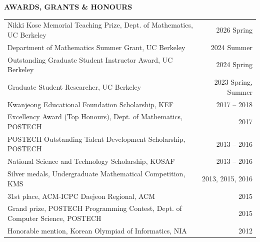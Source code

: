 \documentclass[letterpaper,11pt]{article}
\newcommand{\resheading}[1]{%
  \par\addvspace{10pt}%
  {\sffamily\bfseries\large\color{accent}\MakeUppercase{#1}}\par\nobreak
  \vspace{2pt}{\color{accent!35}\hrule height 0.7pt}\par\nobreak\vspace{5pt}}
\newcommand{\award}[2]{#1 & {\sffamily\small\color{muted}#2}\\}
\begin{document}
\resheading{Awards, Grants \& Honours}
\begin{tabular*}{\linewidth}{@{}l@{\extracolsep{\fill}}r@{}}
  \award{Nikki Kose Memorial Teaching Prize, Dept. of Mathematics, UC Berkeley}{2026 Spring}
  \award{Department of Mathematics Summer Grant, UC Berkeley}{2024 Summer}
  \award{Outstanding Graduate Student Instructor Award, UC Berkeley}{2024 Spring}
  \award{Graduate Student Researcher, UC Berkeley}{2023 Spring, Summer}
  \award{Kwanjeong Educational Foundation Scholarship, KEF}{2017 -- 2018}
  \award{Excellency Award (Top Honours), Dept. of Mathematics, POSTECH}{2017}
  \award{POSTECH Outstanding Talent Development Scholarship, POSTECH}{2013 -- 2016}
  \award{National Science and Technology Scholarship, KOSAF}{2013 -- 2016}
  \award{Silver medals, Undergraduate Mathematical Competition, KMS}{2013, 2015, 2016}
  \award{31st place, ACM-ICPC Daejeon Regional, ACM}{2015}
  \award{Grand prize, POSTECH Programming Contest, Dept. of Computer Science, POSTECH}{2015}
  \award{Honorable mention, Korean Olympiad of Informatics, NIA}{2012}
\end{tabular*} 
\end{document}
